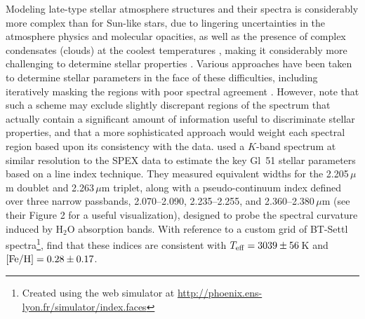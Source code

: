 \documentclass[iop,floatfix]{emulateapj}
\begin{document}
Modeling late-type stellar atmosphere structures and their spectra is
considerably more complex than for Sun-like stars, due to lingering
uncertainties in the atmosphere physics and molecular opacities, as well as the
presence of complex condensates (clouds) at the coolest temperatures
\citep{allard13}, making it considerably more challenging to determine stellar
properties \citep{rajpurohit14}. Various approaches have been taken to
determine stellar parameters in the face of these difficulties, including
iteratively masking the regions with poor spectral agreement \citep{mann13}.
However, \citet{mann13} note that such a scheme may exclude slightly discrepant
regions of the spectrum that actually contain a significant amount of
information useful to discriminate stellar properties, and that a more
sophisticated approach would weight each spectral region based upon its
consistency with the data. \citet{rojas-ayala12} used a $K$-band spectrum at
similar resolution to the SPEX data to estimate the key Gl~51 stellar
parameters based on a line index technique.  They measured equivalent widths
for the 2.205\,$\mu$m  doublet and 2.263\,$\mu$m 
triplet, along with a pseudo-continuum index defined over three narrow
passbands, 2.070--2.090, 2.235--2.255, and 2.360--2.380\,$\mu$m (see their
Figure 2 for a useful visualization), designed to probe the spectral curvature
induced by H$_2$O absorption bands.  With reference to a custom grid of {\sc
BT-Settl} spectra\footnote{Created using the web simulator at
   \url{http://phoenix.ens-lyon.fr/simulator/index.faces}},
\citet{rojas-ayala12} find that these indices are consistent with $T_{\rm
eff} = 3039\pm56$\,K and $[{\rm Fe/H}] = 0.28\pm0.17$.  
\end{document}
